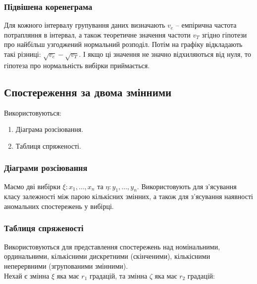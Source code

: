  
\subsubsection{Підвішена коренеграма}

Для кожного інтервалу групування даних визначають $v_e$ -- емпірична частота потрапляння в інтервал, а також теоретичне значення частоти $v_T$ згідно гіпотези про найбільш узгоджений нормальний розподіл. Потім на графіку відкладають такі різниці: $\sqrt{v_e}-\sqrt{v_T}$. І якщо ці значення не значно відхиляються від нуля, то гіпотеза про нормальність вибірки приймається.


\subsection{Спостереження за двома змінними}

Використовуються:
\begin{enumerate}
	\item Діаграма розсіювання.
	\item Таблиця спряженості.
\end{enumerate}

\subsubsection{Діаграми розсіювання}

Маємо дві вибірки $\xi: x_1, \ldots, x_n$ та $\eta: y_1, \ldots, y_n$. Використовують для з'ясування класу залежності між парою кількісних змінних, а також для з'ясування наявності аномальних спостережень у вибірці.


\subsubsection{Таблиця спряженості}

Використовуються для представлення спостережень над номінальними, ординальними, кількісними дискретними (скінченими), кількісними неперервними (згрупованими змінними). \\

Нехай є змінна $\xi$ яка має $r_1$ градацій, та змінна $\zeta$ яка має $r_2$ градацій:

